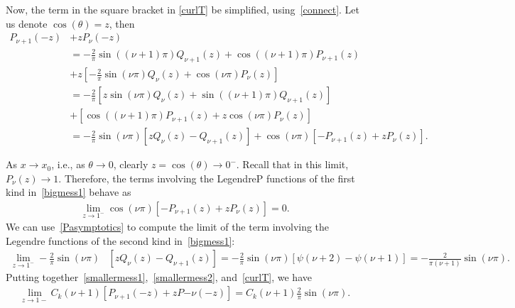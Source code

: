 \documentclass[final]{siamltex}
\newcommand{\C}{C_k}
\begin{document}
 
Now, the term in the square bracket in \eqref{curlT} be simplified,
using~\eqref{connect}. Let us denote $\cos(\theta)=z$, then
\begin{align}
  P_{\nu+1}(-z)& + z P_\nu(-z) \nonumber \\
  &=-\frac{2}{\pi}\sin\left((\nu+1) \pi\right)Q_{\nu+1}(z)+
    \cos((\nu+1)\pi)P_{\nu+1}(z) \\
  &+z\left[-\frac{2}{\pi}\sin(\nu\pi)Q_\nu\left(z\right)+
    \cos(\nu\pi)P_\nu\left(z\right)  \right] \nonumber \\
  &=-\frac{2}{\pi}\left[z\sin(\nu \pi)Q_\nu\left(z\right) + 
    \sin\left((\nu+1) \pi\right)Q_{\nu+1}\left(z\right)\right] \\
  &+ \left[ \cos((\nu+1)\pi)P_{\nu+1}\left(z\right) + 
    z\cos(\nu\pi)P_\nu\left(z\right) \right] \nonumber \\
  &=-\frac{2}{\pi}\sin(\nu \pi)\left[ 
    zQ_\nu\left(z\right) - Q_{\nu+1}\left(z\right)\right] 
  + \cos(\nu\pi)\left[
    -P_{\nu+1}\left(z\right)+zP_\nu\left(z\right)\right].
  \label{bigmess1}
\end{align}
 
As $x\rightarrow x_0$, i.e., as $\theta \rightarrow 0$, clearly $z=\cos(\theta)\rightarrow 0^-$. Recall
that in this limit, $P_\nu(z) \rightarrow 1.$ Therefore, the
terms involving the LegendreP functions of the first kind
in~\eqref{bigmess1} behave as 
\begin{align} 
  \label{smallermess1}
  \lim_{z \rightarrow 1^- }\cos(\nu\pi)\left[ -P_{\nu+1}(z)+ z P_\nu(z)
  \right]  = 0.
\end{align}
We can use~\eqref{Pasymptotics} to compute the limit of the term involving the Legendre functions of the second kind in~\eqref{bigmess1}:
\begin{align}
  \label{smallermess2}
  \lim_{z \rightarrow 1^-}  -  
  \frac{2}{\pi}\sin(\nu\pi)&\left[z
  Q_\nu\left(z\right) - 
  Q_{\nu+1}\left(z\right)\right] 
  =  -\frac{2}{\pi}\sin(\nu \pi)\left[ \psi(\nu+2)-\psi(\nu+1) \right] = -\frac{2}{\pi (\nu+1)}\sin(\nu \pi).
\end{align}
Putting together~\eqref{smallermess1},~\eqref{smallermess2},
and~\eqref{curlT}, we have
\begin{align} 
  \label{doublelayerwithz}
  \lim_{z\rightarrow 1-}\C(\nu+1)\left[ P_{\nu+1}(-z)+zP{-\nu}(-z)\right] =
    \C(\nu+1) \frac{2}{\pi} \sin(\nu \pi).
\end{align}
\end{document}
